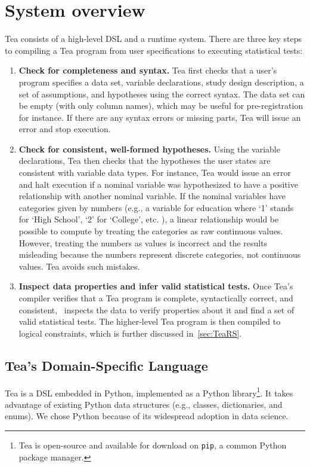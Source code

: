 \section{System overview}
Tea consists of a high-level DSL and a runtime system. There are three key steps
to compiling a Tea program from user specifications to executing statistical
tests:

\begin{enumerate}
    \item \textbf{Check for completeness and syntax.} Tea first checks that a
    user's program specifies a data set, variable declarations, study design
    description, a set of assumptions, and hypotheses using the correct syntax.
    The data set can be empty (with only column names), which may be useful for
    pre-registration for instance. If there are any syntax errors or missing
    parts, Tea will issue an error and stop execution.
    \item \textbf{Check for consistent, well-formed hypotheses.} Using the
    variable declarations, Tea then checks that the hypotheses the user states
    are consistent with variable data types. For instance, Tea would issue an
    error and halt execution if a nominal variable was hypothesized to have a
    positive relationship with another nominal variable. If the nominal
    variables have categories given by numbers (e.g., a variable for education where `1' stands for `High School', `2'
    for `College', etc. ), a linear relationship would be possible to compute by
    treating the categories as raw continuous values. However, treating the numbers as
    values is incorrect and the results misleading because the numbers represent
    discrete categories, not continuous values. Tea avoids such mistakes.
    \item \textbf{Inspect data properties and infer valid statistical tests.}
    Once Tea's compiler verifies that a Tea program is complete, syntactically
    correct, and consistent, \TeaRS~inspects the data to verify properties
    about it and find a set of valid statistical tests. The
    higher-level Tea program is then compiled to logical constraints, which is
    further discussed in~\autoref{sec:TeaRS}.
\end{enumerate}

\subsection{Tea's Domain-Specific Language} \label{sec:TeaPL}
Tea is a DSL embedded in Python, implemented as a Python library\footnote{Tea is open-source and
available for download on \texttt{pip}, a common Python package manager.}. It takes
advantage of existing Python data structures (e.g., classes, dictionaries, and
enums). We chose Python because of its widespread adoption in data science.


